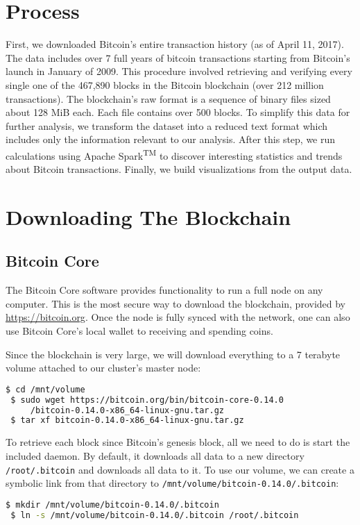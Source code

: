 \documentclass[9pt,twocolumn,twoside]{idsi}
\begin{document}
\section{Process}
First, we downloaded Bitcoin's entire transaction history (as of April 11, 2017). The data includes over 7 full years of bitcoin transactions starting from Bitcoin's launch in January of 2009. This procedure involved retrieving and verifying every single one of the 467,890 blocks in the Bitcoin blockchain (over 212 million transactions). The blockchain's raw format is a sequence of binary files sized about 128 MiB each. Each file contains over 500 blocks. To simplify this data for further analysis, we transform the dataset into a reduced text format which includes only the information relevant to our analysis. After this step, we run calculations using Apache Spark\textsuperscript{TM} to discover interesting statistics and trends about Bitcoin transactions. Finally, we build visualizations from the output data.

\section{Downloading The Blockchain}
\subsection{Bitcoin Core}
The Bitcoin Core software provides functionality to run a full node on any computer. This is the most secure way to download the blockchain, provided by \href{https://bitcoin.org}{https://bitcoin.org}. Once the node is fully synced with the network, one can also use Bitcoin Core's local wallet to receiving and spending coins.

Since the blockchain is very large, we will download everything to a 7 terabyte volume attached to our cluster's master node:
\begin{lstlisting}[language=bash]
 $ cd /mnt/volume
 $ sudo wget https://bitcoin.org/bin/bitcoin-core-0.14.0
     /bitcoin-0.14.0-x86_64-linux-gnu.tar.gz
 $ tar xf bitcoin-0.14.0-x86_64-linux-gnu.tar.gz
\end{lstlisting}

To retrieve each block since Bitcoin's genesis block, all we need to do is start the included daemon. By default, it downloads all data to a new directory \lstinline{/root/.bitcoin} and downloads all data to it. To use our volume, we can create a symbolic link from that directory to \lstinline{/mnt/volume/bitcoin-0.14.0/.bitcoin}:
\begin{lstlisting}[language=bash]
 $ mkdir /mnt/volume/bitcoin-0.14.0/.bitcoin
 $ ln -s /mnt/volume/bitcoin-0.14.0/.bitcoin /root/.bitcoin
\end{lstlisting}
\end{document}
